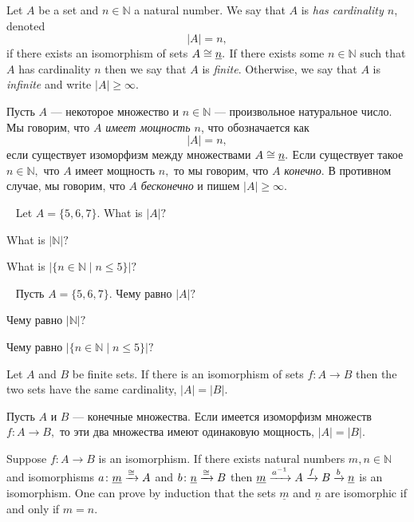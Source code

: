 \documentclass[../main/CT4S-EN-RU]{subfiles}
\begin{document}
\begin{definitionENG}\label{def:cardinality}
Let $A$ be a set and $n\in{ℕ}$ a natural number. We say that $A$ is {\em has cardinality $n$}, denoted $$|A|=n,$$ if there exists an isomorphism of sets $A\cong\underline{n}.$ If there exists some $n\in{ℕ}$ such that $A$ has cardinality $n$ then we say that $A$ is {\em finite}. Otherwise, we say that $A$ is {\em infinite} and write $|A|\geq\infty.$
\end{definitionENG}

\begin{definitionRUS}\label{def:cardinality}
Пусть $A$ — некоторое множество и $n\in{ℕ}$ — произвольное натуральное число. Мы говорим, что $A$ {\em имеет мощность $n$}, что обозначается как $$|A|=n,$$ если существует изоморфизм между множествами $A\cong\underline{n}.$ Если существует такое $n\in{ℕ},$ что $A$ имеет мощность $n,$ то мы говорим, что $A$ {\em конечно}. В противном случае, мы говорим, что $A$ {\em бесконечно} и пишем $|A|\geq\infty.$
\end{definitionRUS}

\begin{exerciseENG}~
\sexc Let $A=\{5,6,7\}.$ What is $|A|?$ 
\item What is $|{ℕ}|?$ 
\item What is $|\{n\in{ℕ}{\;|\;}n\leq 5\}|?$
\endsexc
\end{exerciseENG}

\begin{exerciseRUS}~
\sexc Пусть $A=\{5,6,7\}.$ Чему равно $|A|?$ 
\item Чему равно $|{ℕ}|?$ 
\item Чему равно $|\{n\in{ℕ}{\;|\;}n\leq 5\}|?$
\endsexc
\end{exerciseRUS}

\begin{lemmaENG}
Let $A$ and $B$ be finite sets. If there is an isomorphism of sets $f\colon A{→} B$ then the two sets have the same cardinality, $|A|=|B|.$
\end{lemmaENG}

\begin{lemmaRUS}
Пусть $A$ и $B$ — конечные множества. Если имеется изоморфизм множеств $f\colon A{→} B,$ то эти два множества имеют одинаковую мощность, $|A|=|B|.$ 
\end{lemmaRUS}

\begin{proofENG}
Suppose $f\colon A{→} B$ is an isomorphism. If there exists natural numbers $m,n\in{ℕ}$ and isomorphisms $a\colon\underline{m}\xrightarrow{\cong} A$ and $b\colon\underline{n}\xrightarrow{\cong} B$ then $\underline{m}\xrightarrow{a^{-1}}A\xrightarrow{f}B\xrightarrow{b}\underline{n}$ is an isomorphism. One can prove by induction that the sets $\underline{m}$ and $\underline{n}$ are isomorphic if and only if $m=n.$ 
\end{proofENG}
\end{document}
